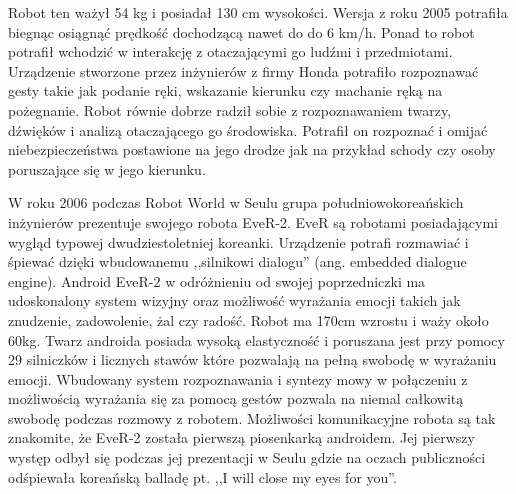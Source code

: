 Robot ten ważył 54 kg i posiadał 130 cm wysokości. Wersja z roku 2005 potrafiła
biegnąc osiągnąć prędkość dochodzącą nawet do do 6 km/h. Ponad to robot potrafił
wchodzić w interakcję z otaczającymi go ludźmi i przedmiotami. Urządzenie
stworzone przez inżynierów z firmy Honda potrafiło rozpoznawać gesty takie jak
podanie ręki, wskazanie kierunku czy machanie ręką na pożegnanie. Robot równie
dobrze radził sobie z rozpoznawaniem twarzy, dźwięków i analizą otaczającego go
środowiska. Potrafił on rozpoznać i omijać niebezpieczeństwa postawione na jego
drodze jak na przykład schody czy osoby poruszające się w jego kierunku.

W roku 2006 podczas Robot World w Seulu grupa południowokoreańskich inżynierów
prezentuje swojego robota EveR-2. EveR są robotami posiadającymi wygląd typowej
dwudziestoletniej koreanki. Urządzenie potrafi rozmawiać i śpiewać dzięki
wbudowanemu ,,silnikowi dialogu'' (ang. embedded dialogue engine). Android
EveR-2 w odróżnieniu od swojej poprzedniczki ma udoskonalony system wizyjny
oraz możliwość wyrażania emocji takich jak znudzenie, zadowolenie, żal czy radość.
Robot ma 170cm wzrostu i waży około 60kg. Twarz androida posiada wysoką
elastyczność i poruszana jest przy pomocy 29 silniczków i licznych stawów
które pozwalają na pełną swobodę w wyrażaniu emocji. Wbudowany system
rozpoznawania i syntezy mowy w połączeniu z możliwością wyrażania się za pomocą
gestów pozwala na niemal całkowitą swobodę podczas rozmowy z robotem. Możliwości
komunikacyjne robota są tak znakomite, że EveR-2 została pierwszą piosenkarką
androidem. Jej pierwszy występ odbył się podczas jej prezentacji w Seulu gdzie
na oczach publiczności odśpiewała koreańską balladę pt. ,,I will close my eyes
for you''.

